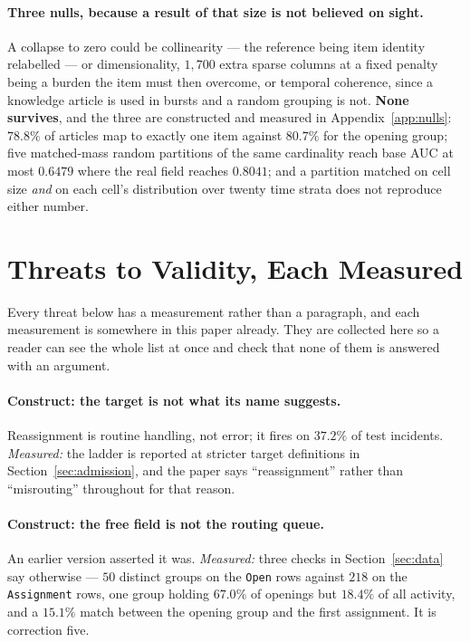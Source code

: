 \documentclass[preprint,12pt]{elsarticle}
\begin{document}
\paragraph{Three nulls, because a result of that size is not believed on
sight.}
A collapse to zero could be collinearity --- the reference being item identity
relabelled --- or dimensionality, $1{,}700$ extra sparse columns at a fixed
penalty being a burden the item must then overcome, or temporal coherence,
since a knowledge article is used in bursts and a random grouping is not.
\textbf{None survives}, and the three are constructed and measured in
Appendix~\ref{app:nulls}: $78.8\%$ of articles map to exactly one item against
$80.7\%$ for the opening group; five matched-mass random partitions of the
same cardinality reach base AUC at most $0.6479$ where the real field reaches
$0.8041$; and a partition matched on cell size \emph{and} on each cell's
distribution over twenty time strata does not reproduce either number.

\section{Threats to Validity, Each Measured}
\label{sec:threats}

Every threat below has a measurement rather than a paragraph, and each
measurement is somewhere in this paper already. They are collected here so a
reader can see the whole list at once and check that none of them is answered
with an argument.

\paragraph{Construct: the target is not what its name suggests.}
Reassignment is routine handling, not error; it fires on $37.2\%$ of test
incidents. \emph{Measured:} the ladder is reported at stricter target
definitions in Section~\ref{sec:admission}, and the paper says
``reassignment'' rather than ``misrouting'' throughout for that reason.

\paragraph{Construct: the free field is not the routing queue.}
An earlier version asserted it was. \emph{Measured:} three checks in
Section~\ref{sec:data} say otherwise --- $50$ distinct groups on the
\texttt{Open} rows against $218$ on the \texttt{Assignment} rows, one group
holding $67.0\%$ of openings but $18.4\%$ of all activity, and a $15.1\%$
match between the opening group and the first assignment. It is correction
five.
\end{document}
